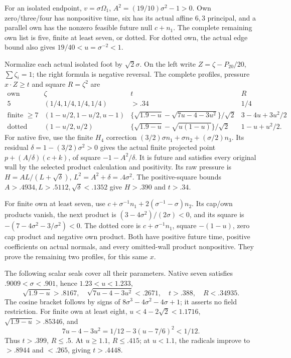 For an isolated endpoint,
\(v=\sigma\Omega_1\),
\(A^2=(19/10)\sigma^2-1>0\).
Own zero/three/four has nonpositive
time, six has its actual affine
\(6,3\) principal, and a parallel
own has the nonzero feasible future
null \(c+n_1\).
The complete remaining own list is
five, finite at least seven, or
dotted.
For dotted own, the actual edge
bound also gives \(19/40<u=\sigma^{-2}<1\).

Normalize each actual isolated foot
by \(\sqrt2\sigma\).
On the left write
\(Z=\zeta-P_{20}/20\), \(\sum\zeta_i=1\);
the right formula is negative reversal.
The complete profiles, pressure
\(x\cdot Z\ge t\) and square \(R=\zeta^2\)
are
\[
\begin{array}{c|c|c|c}
 \text{own}&\zeta&t&R\\ \hline
 5&(1/4,1/4,1/4,1/4)&>.34&1/4\\
 \text{finite }\ge7&(1-u/2,1-u/2,u-1)&
 \{\sqrt{1.9-u}-\sqrt{7u-4-3u^2}\}/\sqrt2&
                      3-4u+3u^2/2\\
 \text{dotted}&(1-u/2,u/2)&
 \{\sqrt{1.9-u}-\sqrt{u(1-u)}\}/\sqrt2&
                      1-u+u^2/2 .
\end{array}
\tag{A19endfeet}\label{app:exact19:eq:Aendfeet}
\]
For native five, use the finite
\(H_4\) correction
\((3/2)\sigma n_1+\sigma n_2+(\sigma/2)n_3\).
Its residual
\(\delta=1-(3/2)\sigma^2>0\)
gives the actual finite projected
point \(p+(A/\delta)(c+k)\),
of square \(-1-A^2/\delta\).
It is future and satisfies every
original wall by the selected
product calculation and positivity.
Its raw pressure is
\(H=AL/(L+\sqrt\delta)\),
\(L^2=A^2+\delta=.4\sigma^2\).
The positive-square bounds
\(A>.4934,L>.5112,\sqrt\delta<.1352\)
give \(H>.390\) and \(t>.34\).

For finite own at least seven,
use
\(c+\sigma^{-1}n_1+2(\sigma^{-1}-\sigma)n_2\).
Its cap/own products vanish, the
next product is
\((3-4\sigma^2)/(2\sigma)<0\),
and its square is
\(-(7-4\sigma^2-3/\sigma^2)<0\).
The dotted core is
\(c+\sigma^{-1}n_1\), square
\(-(1-u)\), zero cap product
and negative own product.
Both have positive future time,
positive coefficients on actual
normals, and every omitted-wall
product nonpositive.
They prove the remaining two
profiles, for this same \(x\).

The following scalar seals cover
all their parameters.
Native seven satisfies
\(.9009<\sigma<.901\), hence
\(1.23<u<1.233\),
\[
 \sqrt{1.9-u}>.8167,\quad
 \sqrt{7u-4-3u^2}<.2671,\quad
                             t>.388,\quad R<.34935 .
\]
The cosine bracket follows by signs
of \(8\sigma^3-4\sigma^2-4\sigma+1\);
it asserts no field restriction.
For finite own at least eight,
\(u<4-2\sqrt2<1.1716\),
\(\sqrt{1.9-u}>.85346\), and
\[
 7u-4-3u^2=1/12-3(u-7/6)^2<1/12 .
\]
Thus \(t>.399\), \(R\le.5\).
At \(u\ge1.1\), \(R\le.415\);
at \(u<1.1\), the radicals improve
to \(>.8944\) and \(<.265\),
giving \(t>.4448\).

